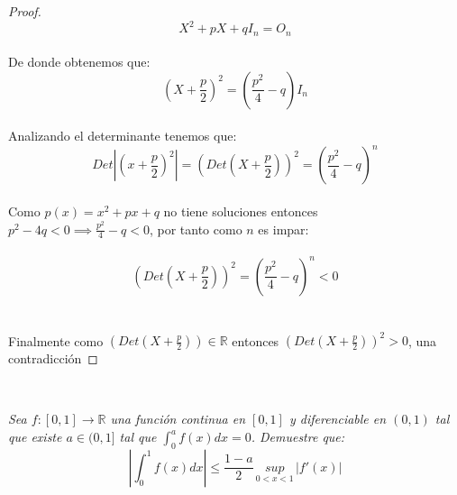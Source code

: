 \documentclass[11pt,letterpaper]{article}
\newcommand{\R}{\mathbb{R}}
\begin{document}
\begin{proof}
\begin{equation*}
        X^2+pX+qI_n=O_n
    \end{equation*}\,\\
    De donde obtenemos que:\,\\
    \begin{equation*}
        \left(X+\frac{p}{2}\right)^2=\left(\frac{p^2}{4}-q\right)I_n
    \end{equation*}\,\\
    Analizando el determinante tenemos que:\,\\
    \begin{equation*}
        Det\left|\left(x+\frac{p}{2}\right)^2\right|=\left(Det\left(X+\frac{p}{2}\right)\right)^2=\left(\frac{p^2}{4}-q\right)^n
    \end{equation*}\,\\
Como $p(x)=x^2+px+q$ no tiene soluciones entonces $p^2-4q<0\implies\frac{p^2}{4}-q<0$, por tanto como $n$ es impar:\,\\
\,\\
\begin{equation*}
    \left(Det\left(X+\frac{p}{2}\right)\right)^2=\left(\frac{p^2}{4}-q\right)^n<0
\end{equation*}\,\\
\,\\
Finalmente como $\left(Det\left(X+\frac{p}{2}\right)\right)\in \R$ entonces $\left(Det\left(X+\frac{p}{2}\right)\right)^2>0$, una contradicci\'on
\end{proof}
\newpage
\,\\
\begin{tcolorbox}[
	title = \textcolor{black}{\textcolor{white}{Problema 5}},]
\textit{Sea $f:[0,1]\rightarrow \R$ una funci\'on continua en $[0,1]$ y diferenciable en $(0,1)$ tal que existe $a\in(0,1]$ tal que
$\int_{0}^a f(x)dx=0$. Demuestre que:\,\\
\begin{equation*}
    \left|\int_{0}^{1}f(x)dx\right|\leq \frac{1-a}{2}\, \underset{0<x<1}{sup}\,|f'(x)|
\end{equation*}
}
\end{tcolorbox}
\end{document}
